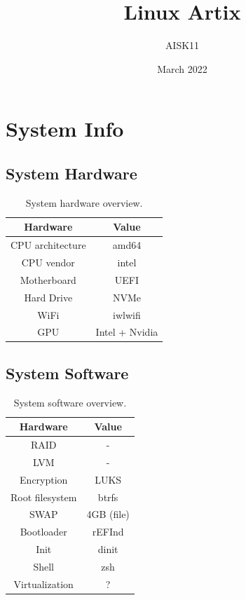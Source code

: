 \documentclass[10pt, a4paper, onecolumn, oneside, titlepage, openany]{book}
\title{\textbf{Linux Artix}}
\author{AISK11}
\date{March 2022}
\begin{document}
\maketitle
\tableofcontents


\chapter{System Info}
\section{System Hardware}
\begin{table}[h!]
\centering
\begin{tabular}{|c|c|}
    \hline
    \textbf{Hardware} & \textbf{Value} \\
    \hline
    CPU architecture & amd64\\
    CPU vendor & intel\\
    Motherboard & UEFI\\
    Hard Drive & NVMe\\
    WiFi & iwlwifi\\
    GPU & Intel + Nvidia\\
    \hline
\end{tabular}
\caption{System hardware overview.}
\label{table:1}
\end{table}

\section{System Software}
\begin{table}[h!]
\centering
\begin{tabular}{|c|c|}
    \hline
    \textbf{Hardware} & \textbf{Value} \\
    \hline
    RAID & -\\
    LVM & -\\
    Encryption & LUKS\\
    Root filesystem & btrfs\\
    SWAP & 4GB (file)\\
    Bootloader & rEFInd\\
    Init & dinit\\
    Shell & zsh\\
    Virtualization & ?\\
    \hline
\end{tabular}
\caption{System software overview.}
\label{table:2}
\end{table}
\end{document}
